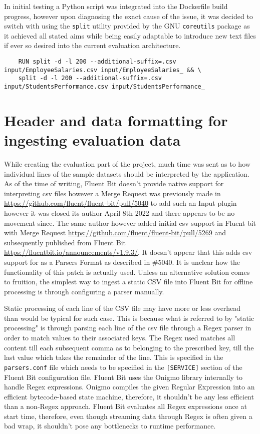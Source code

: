 In initial testing a Python script was integrated into the Dockerfile build progress, however upon diagnosing the exact cause of the issue, it was decided to switch with using the \texttt{split} utility provided by the GNU \texttt{coreutils} package as it achieved all stated aims while being easily adaptable to introduce new text files if ever so desired into the current evaluation architecture.
\begin{verbatim}
    RUN split -d -l 200 --additional-suffix=.csv input/EmployeeSalaries.csv input/EmployeeSalaries_ && \
    split -d -l 200 --additional-suffix=.csv input/StudentsPerformance.csv input/StudentsPerformance_
\end{verbatim}

\section{Header and data formatting for ingesting evaluation data}
While creating the evaluation part of the project, much time was sent as to how individual lines of the sample datasets should be interpreted by the application. As of the time of writing, Fluent Bit doesn't provide native support for interpreting \acrshort{csv} files however a Merge Request was previously made in \href{#5040}{https://github.com/fluent/fluent-bit/pull/5040} to add such an Input plugin however it was closed its author April 8th 2022 and there appears to be no movement since. The same author however added initial \acrshort{csv} support in Fluent bit with Merge Request \href{#5269}{https://github.com/fluent/fluent-bit/pull/5269} and subsequently published from Fluent Bit \href{v1.9.3}{https://fluentbit.io/announcements/v1.9.3/}. It doesn't appear that this adds \acrshort{csv} support for as a Parsers Format as described in \#5040. It is unclear how the functionality of this patch is actually used. Unless an alternative solution comes to fruition, the simplest way to ingest a static CSV file into Fluent Bit for offline processing is through configuring a parser manually.

Static processing of each line of the CSV file may have more or less overhead than would be typical for such case. This is because what is referred to by "static processing" is through parsing each line of the csv file through a Regex parser in order to match values to their associated keys. The Regex used matches all content till each subsequent comma as to belonging to the prescribed key, till the last value which takes the remainder of the line. This is specified in the \texttt{parsers.conf} file which needs to be specified in the \texttt{[SERVICE]} section of the Fluent Bit configuration file. Fluent Bit uses the Onigmo library internally to handle Regex expressions. Onigmo compiles the given Regular Expression into an efficient bytecode-based state machine\cite{Hess_2023}, therefore, it shouldn't be any less efficient than a non-Regex approach. Fluent Bit evaluates all Regex expressions once at start time, therefore, even though streaming data through Regex is often given a bad wrap, it shouldn't pose any bottlenecks to runtime performance.

